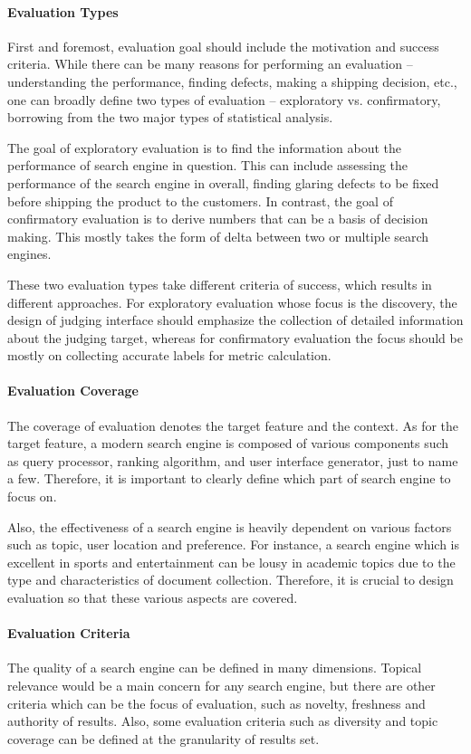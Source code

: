 \paragraph{Evaluation Types}
First and foremost, evaluation goal should include the motivation and success criteria. While there can be many reasons for performing an evaluation -- understanding the performance, finding defects, making a shipping decision, etc., one can broadly define two types of evaluation -- exploratory vs. confirmatory, borrowing from the two major types of statistical analysis. %

The goal of exploratory evaluation is to find the information about the performance of search engine in question. This can include assessing the performance of the search engine in overall, finding glaring defects to be fixed before shipping the product to the customers. In contrast, the goal of confirmatory evaluation is to derive numbers that can be a basis of decision making. This mostly takes the form of delta between two or multiple search engines. 

These two evaluation types take different criteria of success, which results in different approaches. For exploratory evaluation whose focus is the discovery, the design of judging interface should emphasize the collection of detailed information about the judging target, whereas for confirmatory evaluation the focus should be mostly on collecting accurate labels for metric calculation. 

\paragraph{Evaluation Coverage}
The coverage of evaluation denotes the target feature and the context. As for the target feature, a modern search engine is composed of various components such as query processor, ranking algorithm, and user interface generator, just to name a few. Therefore, it is important to clearly define which part of search engine to focus on.

Also, the effectiveness of a search engine is heavily dependent on various factors such as topic, user location and preference. For instance, a search engine which is excellent in sports and entertainment can be lousy in academic topics due to the type and characteristics of document collection. Therefore, it is crucial to design evaluation so that these various aspects are covered. 

\paragraph{Evaluation Criteria}
The quality of a search engine can be defined in many dimensions. Topical relevance would be a main concern for any search engine, but there are other criteria which can be the focus of evaluation, such as novelty, freshness and authority of results. Also, some evaluation criteria such as diversity and topic coverage can be defined at the granularity of results set.

